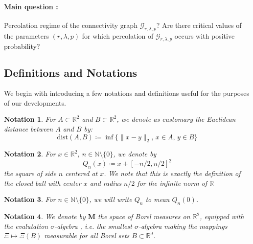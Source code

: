 \documentclass[10pt,a4paper]{amsart}
\theoremstyle{exampstyle}
\newtheorem{Remark}{Remark}
\theoremstyle{exampnotations}
\newtheorem{Notation}{Notation}
\begin{document}

\paragraph*{Main question :} Percolation regime of the connectivity graph $\mathcal{G}_{r,\lambda, p}$? Are there critical values of the parameters $(r,\lambda,p)$ for which percolation of $\mathcal{G}_{r,\lambda, p}$ occurs with positive probability?

\subsection{Definitions and Notations}
We begin with introducing a few notations and definitions useful for the purposes of our developments.
 \begin{Notation}
 For $A \subset \mathbb{R}^{2}$ and $B \subset \mathbb{R}^{2}$, we denote as customary the Euclidean distance between $A$ and $B$ by:
 $$\text{dist}(A,B) \coloneqq \inf \lbrace \lVert x - y \rVert_{2} , \,  x \in A, \,  y \in B \rbrace$$
 \end{Notation}

\begin{Notation}
For $x \in \mathbb{R}^{2}$, $n \in \mathbb{N} \setminus \lbrace 0 \rbrace$, we denote by $$Q_n(x) \coloneqq x + \left[-n/2,n/2\right]^{2}$$ the square of side $n$ centered at $x$. We note that this is exactly the definition of the closed ball with center $x$ and radius $n/2$ for the infinite norm of $\mathbb{R}$
\end{Notation}

\begin{Notation}
For $n \in \mathbb{N} \setminus \lbrace 0 \rbrace$, we will write 
$Q_n$ to mean $Q_n(0)$.
\end{Notation}

\begin{Notation}
We denote by $\mathbf{M}$ the space of Borel measures on $\mathbb{R}^{2}$, equipped with the evalutation $\sigma$-algebra \cite[Section 13.1]{last2017lectures}, i.e. the smallest $\sigma$-algebra making the mappings $\Xi \mapsto \Xi(B)$ measurable for all Borel sets $B \subset \mathbb{R}^{d}$.
\end{Notation}
\end{document}
